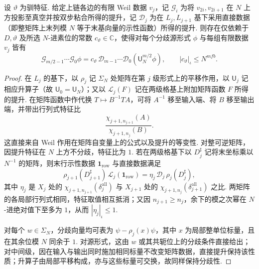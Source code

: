 \begin{lemma}[粘合链化为直接提升链]
\label{lem:a-level-direct-chain}
\emitthmsource
设 $\vartheta$ 为驯特征. 给定上链各边的有限 Weil 数据 $v_j$，记 $\mathcal G_i$ 为将 $v_{2i},v_{2i+1}$ 在 $N$ 上方投影至真空并按双步粘合所得的提升，记 $\mathcal D_j$ 为在 $L_j,L_{j+1}$ 基下采用直接数据（即整矩阵上末列模 $N$ 等于末基向量的示性函数）所得的提升. 则存在仅依赖于 $D,\vartheta$ 及所选 $N$-进素位的常数 $c_\vartheta\in\mathbb C$，使得对每个分歧源形式 $\phi$ 与每组有限数据 $v_j$ 皆有
\[
 \mathcal G_{m/2-1}\cdots\mathcal G_0\phi
 =c_\vartheta\,\mathcal D_{m-1}\cdots\mathcal D_0
                (\mathsf U_N^{m/2}\phi),\qquad
 |c_\vartheta|_\iota\le N^{mfb}.
\]
\end{lemma}
\begin{proof}
在 $L_j$ 的基下，以 $\rho_j$ 记 $\Sigma_N$ 处矩阵在第 $j$ 级形式上的平移作用，以 $\mathsf U_j$ 记相应升算子（故 $\mathsf U_0=\mathsf U_N$）；又以 $\mathcal L_j(F)$ 记在两级格基上附加矩阵函数 $F$ 所得的提升. 在矩阵函数中作代换 $T\mapsto B^{-1}TA$，可将 $A^{-1}$ 移至输入端、将 $B$ 移至输出端，并带出行列式特征比
\[
 \frac{\chi_{j+1,n_{j+1}}(A)}{\chi_{j+1,n_j}(B)} .
\]
这直接来自 Weil 作用在矩阵自变量上的公式以及提升的等变性. 对整可逆矩阵，因提升特征在 $N$ 上方不分歧，特征比为 $1$. 若在两级格基下以 $D_j^\sharp$ 记将末坐标乘以 $N^{-1}$ 的矩阵，则末行示性数据 $\mathbf 1_{\mathrm{row}}$ 与直接数据满足
\[
 \rho_{j+1}(D_{j+1}^\sharp)\,\mathcal L_j(\mathbf 1_{\mathrm{row}})
   =\eta_j\,\mathcal D_j\,\rho_j(D_j^\sharp),
\]
其中 $\eta_j$ 是 $X_j$ 处的 $\chi_{j+1,n_{j+1}}(\delta_j^{\mathrm{all}})$ 与 $X_{j+1}$ 处的 $\chi_{j+1,n_j}(\delta_{j+1}^{\mathrm{all}})$ 之比. 两矩阵的各局部行列式相同，特征取值相互抵消；又因 $n_{j+1}\ge n_j$，余下的模之次幂在 $N$-进绝对值下至多为 $1$，从而 $|\eta_j|_\iota\le1$.

对每个 $w\in\Sigma_N$，分歧向量均可表为 $\psi-\rho_j(x)\psi$，其中 $x$ 为局部整单位标量，且在其余位模 $N$ 同余于 $1$. 对源形式，这由 $w$ 或其共轭位上的分歧条件直接给出；对中间级，因在输入与输出同时施加相同标量不改变矩阵数据，直接提升保持该性质；升算子由局部平移构成，亦与这些标量可交换，故同样保持分歧性.


\end{proof}
